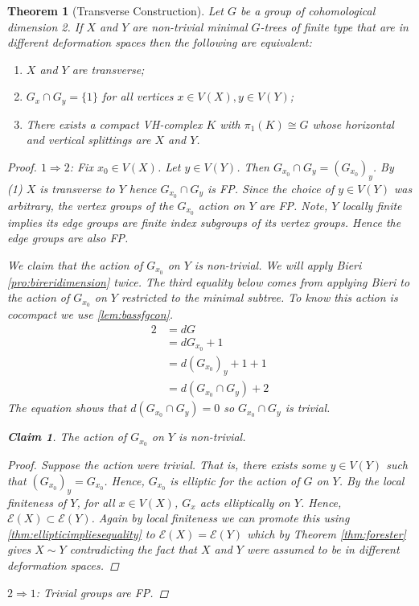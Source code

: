 \documentclass[12pt,parskip=full]{report}
\theoremstyle{plain}
\newtheorem{thm}{Theorem}[section]
\theoremstyle{definition}
\newtheorem*{claim*}{Claim}
\begin{document}
\begin{thm}
    [Transverse Construction]
    \label{pro:transverseconstruction} 
 Let \(G\) be a group of cohomological dimension 2. If \(X\) and \(Y\) are non-trivial minimal \(G\)-trees of finite type that are in different deformation spaces then the following are equivalent:
\begin{enumerate}
    \item $X$ and $Y$ are transverse;
    \item $G_x\cap G_y = \{1\}$ for all vertices \(x \in V(X), y\in V(Y)\);
    \item There exists a compact VH-complex $K$ with $\pi_1(K) \cong G$ whose horizontal and vertical splittings are $X$ and $Y$.
\end{enumerate}
\begin{proof}

    $1\Rightarrow 2$: Fix $x_0 \in V(X)$. Let $y\in V(Y)$. Then $G_{x_0} \cap G_y = (G_{x_0})_y$. By (1) $X$ is transverse to $Y$ hence $G_{x_0}\cap G_y$ is FP. Since the choice of $y\in V(Y)$ was arbitrary, the vertex groups of the $G_{x_0}$ action on $Y$ are FP. Note, $Y$ locally finite implies its edge groups are finite index subgroups of its vertex groups. Hence the edge groups are also FP. 
    
    We claim that the action of $G_{x_0}$ on $Y$ is non-trivial. We will apply Bieri \ref{pro:bireridimension} twice. The third equality below comes from applying Bieri to the action of \(G_{x_0}\) on \(Y\) restricted to the minimal subtree. To know this action is cocompact we use \ref{lem:bassfgcon}.
    \begin{align*}
        2 &= dG\\
          &= dG_{x_0}+1\\
          &= d( G_{x_0} )_y+1+1\\
          &= d(G_{x_0}\cap G_y)+2
    \end{align*}
    The equation shows that $d(G_{x_0}\cap G_y)=0$ so $G_{x_0}\cap G_y$ is trivial.
    
    \begin{claim*}
    The action of $G_{x_0}$ on $Y$ is non-trivial.
    \begin{proof}
        Suppose the action were trivial. That is, there exists some $y\in V(Y)$ such that $(G_{x_0})_y=G_{x_0}$. Hence, $G_{x_0}$ is elliptic for the action of $G$ on $Y$. By the local finiteness of $Y$, for all $x\in V(X)$, $G_x$ acts elliptically on $Y$. Hence, $\mathcal{E}(X)\subset \mathcal{E}(Y)$. Again by local finiteness we can promote this using \ref{thm:ellipticimpliesequality} to $\mathcal{E}(X) = \mathcal{E}(Y)$ which by Theorem \ref{thm:forester} gives $X \sim Y$  contradicting the fact that $X$ and $Y$ were assumed to be in different deformation spaces.
    \end{proof}
    \end{claim*}
$2\Rightarrow 1$: Trivial groups are FP.


\end{proof}
\end{thm}
\end{document}

